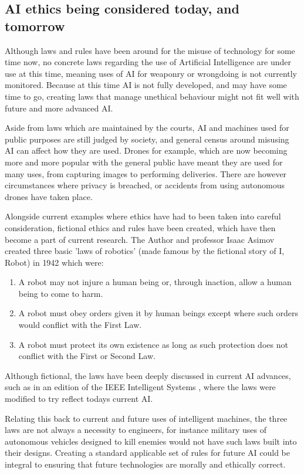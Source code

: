 \documentclass[article]{IEEEtran}
\begin{document}
\subsection{AI ethics being considered today, and tomorrow}
Although laws and rules have been around for the misuse of technology for some time now, no concrete laws regarding the use of Artificial Intelligence are under use at this time, meaning uses of AI for weaponry or wrongdoing is not currently monitored. Because at this time AI is not fully developed, and may have some time to go, creating laws that manage unethical behaviour might not fit well with future and more advanced AI. \par
Aside from laws which are maintained by the courts, AI and machines used for public purposes are still judged by society, and general census around misusing AI can affect how they are used. Drones for example, which are now becoming more and more popular with the general public have meant they are used for many uses, from capturing images to performing deliveries. There are however circumstances where privacy is breached, or accidents from using autonomous drones have taken place.\par
Alongside current examples where ethics have had to been taken into careful consideration, fictional ethics and rules have been created, which have then become a part of current research. The Author and professor Isaac Asimov created three basic 'laws of robotics' (made famous by the fictional story of I, Robot) in \cite{laws} 1942 which were:
\begin{enumerate}
\item A robot may not injure a human being or, through inaction, allow a human being to come to harm.
\item A robot must obey orders given it by human beings except where such orders would conflict with the First Law.
\item A robot must protect its own existence as long as such protection does not conflict with the First or Second Law. 
\end{enumerate}
Although fictional, the laws have been deeply discussed in current AI advances, such as in an edition of the IEEE Intelligent Systems \cite{ieeRobots}, where the laws were modified to try reflect todays current AI.\par
 Relating this back to current and future uses of intelligent machines, the three laws are not always a necessity to engineers, for instance military uses of autonomous vehicles designed to kill enemies would not have such laws built into their designs. 
Creating a standard applicable set of rules for future AI could be integral to ensuring that future technologies are morally and ethically correct.\par
\end{document}
